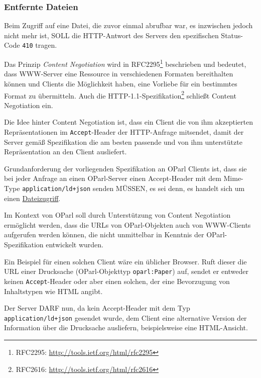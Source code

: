 \documentclass[,a4paper]{article}
\begin{document}
\subsubsection{Entfernte Dateien}\label{entfernte-dateien}

Beim Zugriff auf eine Datei, die zuvor einmal abrufbar war, es
inzwischen jedoch nicht mehr ist, SOLL die HTTP-Antwort des Servers den
spezifischen Status-Code \texttt{410} tragen.


Das Prinzip \emph{Content Negotiation} wird in RFC2295\footnote{RFC2295:
  \url{http://tools.ietf.org/html/rfc2295}} beschrieben und bedeutet,
dass WWW-Server eine Ressource in verschiedenen Formaten bereithalten
können und Clients die Möglichkeit haben, eine Vorliebe für ein
bestimmtes Format zu übermitteln. Auch die
HTTP-1.1-Spezifikation\footnote{RFC2616:
  \url{http://tools.ietf.org/html/rfc2616}} schließt Content Negotiation
ein.

Die Idee hinter Content Negotiation ist, dass ein Client die von ihm
akzeptierten Repräsentationen im \texttt{Accept}-Header der HTTP-Anfrage
mitsendet, damit der Server gemäß Spezifikation die am besten passende
und von ihm unterstützte Repräsentation an den Client ausliefert.

Grundanforderung der vorliegenden Spezifikation an OParl Clients ist,
dass sie bei jeder Anfrage an einen OParl-Server einen Accept-Header mit
dem Mime-Type \texttt{application/ld+json} senden MÜSSEN, es sei denn,
es handelt sich um einen \hyperref[dateizugriff]{Dateizugriff}.

Im Kontext von OParl soll durch Unterstützung von Content Negotiation
ermöglicht werden, dass die URLs von OParl-Objekten auch von WWW-Clients
aufgerufen werden können, die nicht unmittelbar in Kenntnis der
OParl-Spezifikation entwickelt wurden.

Ein Beispiel für einen solchen Client wäre ein üblicher Browser. Ruft
dieser die URL einer Drucksache (OParl-Objekttyp \texttt{oparl:Paper})
auf, sendet er entweder keinen \texttt{Accept}-Header oder aber einen
solchen, der eine Bevorzugung von Inhaltstypen wie HTML angibt.

Der Server DARF nun, da kein Accept-Header mit dem Typ
\texttt{application/ld+json} gesendet wurde, dem Client eine alternative
Version der Information über die Drucksache ausliefern, beispielsweise
eine HTML-Ansicht.
\end{document}
